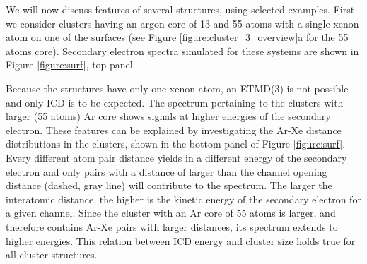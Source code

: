 We will now discuss features of several structures, using selected examples.
First we consider clusters having an argon core of 13 and 55 atoms with a single xenon
atom on one of the surfaces (see Figure \ref{figure:cluster_3_overview}a
for the 55 atoms core).
Secondary electron spectra simulated for these systems are shown in Figure \ref{figure:surf}, top panel.


Because the structures have only one xenon atom, an ETMD(3) is not possible
and only ICD is to be expected. 
The spectrum pertaining to the clusters with larger (55 atoms) Ar core shows
signals at higher energies of the secondary electron. These features
can be explained by investigating the Ar-Xe distance distributions
in the clusters, shown
in the bottom panel of Figure \ref{figure:surf}. 
Every different atom pair distance
yields in a different energy of the secondary electron and only pairs
with a distance of larger than the channel opening distance
(dashed, gray line) will contribute
to the spectrum. 
The larger the interatomic distance, the higher is the
kinetic energy of the secondary electron for a given channel.
Since the cluster with an Ar core of 55 atoms is larger, and therefore
contains Ar-Xe pairs with larger distances, its spectrum extends to
higher energies.
This relation between ICD energy and cluster size holds true for all cluster structures.

